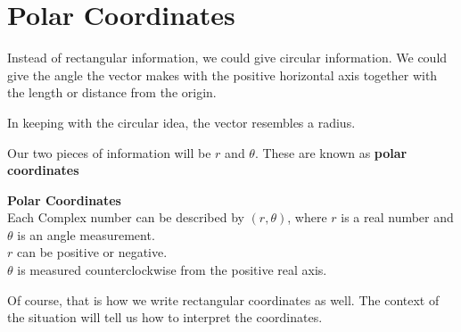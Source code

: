 \documentclass{ximera}
\begin{document}
\section{Polar Coordinates}

Instead of rectangular information, we could give circular information.  We could give the angle the vector makes with the positive horizontal axis together with the length or distance from the origin. 

In keeping with the circular idea, the vector resembles a radius.  

Our two pieces of information will be $r$ and $\theta$. These are known as \textbf{polar coordinates}




\begin{definition}   \textbf{\textcolor{green!50!black}{Polar Coordinates}} \\

Each Complex number can be described by $(r, \theta)$, where $r$ is a real number and $\theta$ is an angle measurement.  \\


$r$ can be positive or negative. \\
$\theta$ is measured counterclockwise from the positive real axis. \\

\end{definition}


Of course, that is how we write rectangular coordinates as well.  The context of the situation will tell us how to interpret the coordinates.
\end{document}

